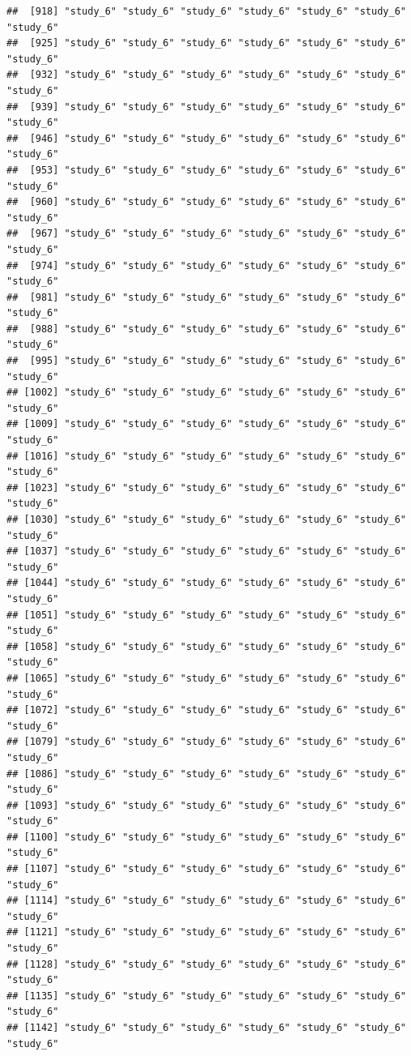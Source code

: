 \documentclass[
  american,
  man,floatsintext]{apa7}
\begin{document}
\begin{verbatim}
##  [918] "study_6" "study_6" "study_6" "study_6" "study_6" "study_6" "study_6"
##  [925] "study_6" "study_6" "study_6" "study_6" "study_6" "study_6" "study_6"
##  [932] "study_6" "study_6" "study_6" "study_6" "study_6" "study_6" "study_6"
##  [939] "study_6" "study_6" "study_6" "study_6" "study_6" "study_6" "study_6"
##  [946] "study_6" "study_6" "study_6" "study_6" "study_6" "study_6" "study_6"
##  [953] "study_6" "study_6" "study_6" "study_6" "study_6" "study_6" "study_6"
##  [960] "study_6" "study_6" "study_6" "study_6" "study_6" "study_6" "study_6"
##  [967] "study_6" "study_6" "study_6" "study_6" "study_6" "study_6" "study_6"
##  [974] "study_6" "study_6" "study_6" "study_6" "study_6" "study_6" "study_6"
##  [981] "study_6" "study_6" "study_6" "study_6" "study_6" "study_6" "study_6"
##  [988] "study_6" "study_6" "study_6" "study_6" "study_6" "study_6" "study_6"
##  [995] "study_6" "study_6" "study_6" "study_6" "study_6" "study_6" "study_6"
## [1002] "study_6" "study_6" "study_6" "study_6" "study_6" "study_6" "study_6"
## [1009] "study_6" "study_6" "study_6" "study_6" "study_6" "study_6" "study_6"
## [1016] "study_6" "study_6" "study_6" "study_6" "study_6" "study_6" "study_6"
## [1023] "study_6" "study_6" "study_6" "study_6" "study_6" "study_6" "study_6"
## [1030] "study_6" "study_6" "study_6" "study_6" "study_6" "study_6" "study_6"
## [1037] "study_6" "study_6" "study_6" "study_6" "study_6" "study_6" "study_6"
## [1044] "study_6" "study_6" "study_6" "study_6" "study_6" "study_6" "study_6"
## [1051] "study_6" "study_6" "study_6" "study_6" "study_6" "study_6" "study_6"
## [1058] "study_6" "study_6" "study_6" "study_6" "study_6" "study_6" "study_6"
## [1065] "study_6" "study_6" "study_6" "study_6" "study_6" "study_6" "study_6"
## [1072] "study_6" "study_6" "study_6" "study_6" "study_6" "study_6" "study_6"
## [1079] "study_6" "study_6" "study_6" "study_6" "study_6" "study_6" "study_6"
## [1086] "study_6" "study_6" "study_6" "study_6" "study_6" "study_6" "study_6"
## [1093] "study_6" "study_6" "study_6" "study_6" "study_6" "study_6" "study_6"
## [1100] "study_6" "study_6" "study_6" "study_6" "study_6" "study_6" "study_6"
## [1107] "study_6" "study_6" "study_6" "study_6" "study_6" "study_6" "study_6"
## [1114] "study_6" "study_6" "study_6" "study_6" "study_6" "study_6" "study_6"
## [1121] "study_6" "study_6" "study_6" "study_6" "study_6" "study_6" "study_6"
## [1128] "study_6" "study_6" "study_6" "study_6" "study_6" "study_6" "study_6"
## [1135] "study_6" "study_6" "study_6" "study_6" "study_6" "study_6" "study_6"
## [1142] "study_6" "study_6" "study_6" "study_6" "study_6" "study_6" "study_6"

\end{verbatim}
\end{document}
